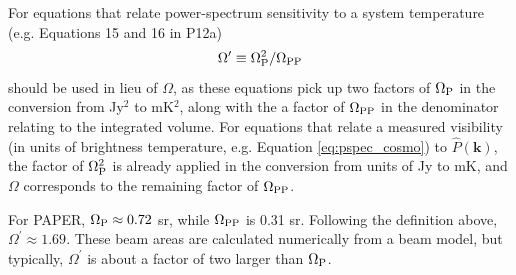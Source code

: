 \documentclass[twocolumn,numberedappendix]{emulateapj}
\def\k{\mathbf{k}}
\begin{document}
For equations that relate power-spectrum sensitivity to a system temperature
(e.g. Equations 15 and 16 in P12a)
\begin{equation}
\Omega^\prime\equiv\Omega_{\rm P}^2/\Omega_{\rm PP}
\end{equation}
should be used in lieu of $\Omega$, as
these equations pick up two factors of $\Omega_{\rm P}$ in the conversion from Jy$^2$ to mK$^2$, along with
the a factor of $\Omega_{\rm PP}$ in the denominator relating to the integrated volume.
For equations that relate a measured visibility (in units of brightness
temperature, e.g. Equation \ref{eq:pspec_cosmo}) to $\widehat P(\k)$, the factor of 
$\Omega_{\rm P}^2$ is already 
applied in the conversion from units of Jy to mK, 
and $\Omega$ corresponds to the remaining factor of $\Omega_{\rm PP}$. 

For PAPER, $\Omega_{\rm P}\approx0.72$ sr, while $\Omega_{\rm PP}$ is 0.31 sr.  Following the definition
above, $\Omega^\prime\approx1.69$.  These beam areas are calculated numerically from
a beam model, but typically, $\Omega^\prime$ is about a factor of two larger than $\Omega_{\rm P}$.



\end{document}
